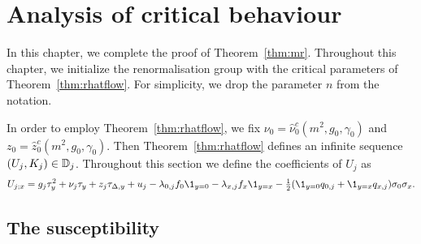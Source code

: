 \chapter{Analysis of critical behaviour}
\label{sec:chi-G-xi}

In this chapter, we complete the proof of Theorem~\ref{thm:mr}.
Throughout this chapter, we initialize the renormalisation group
with the critical parameters of Theorem~\ref{thm:rhatflow}.
For simplicity, we drop the parameter $n$ from the notation.


In order to employ Theorem~\ref{thm:rhatflow}, we fix
$\nu_0 = \hat\nu_0^c(m^2, g_0, \gamma_0)$
and $z_0 = \hat z_0^c(m^2, g_0, \gamma_0)$. Then Theorem~\ref{thm:rhatflow}
defines an infinite sequence $(U_j, K_j) \in \mathbb{D}_j$. Throughout this
section we define the coefficients of $U_j$ as
\begin{equation}
U_{j;x}
	=
g_j \tau_y^2 + \nu_j \tau_y + z_j \tau_{\Delta,y} + u_j
- \lambda_{0,j} f_0 \1_{y=0}
- \lambda_{x,j} f_x \1_{y=x}
- \tfrac12 (\1_{y=0} q_{0,j} + \1_{y=x} q_{x,j}) \sigma_0 \sigma_x.
\end{equation}



\section{The susceptibility}
\label{sec:suscept}

